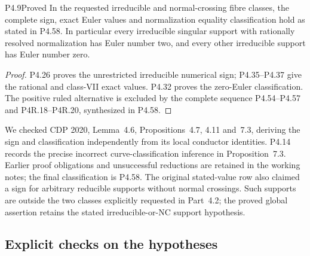 \begin{statement}{P4.9}{Proved}
In the requested irreducible and normal-crossing fibre classes,
the complete sign, exact Euler values and normalization equality
classification hold as stated in P4.58. In particular every
irreducible singular support with rationally resolved normalization
has Euler number two, and every other irreducible support has
Euler number zero.
\end{statement}
\begin{proof}
P4.26 proves the unrestricted irreducible numerical sign;
P4.35--P4.37 give the rational and class-VII exact values.
P4.32 proves the zero-Euler classification. The positive ruled
alternative is excluded by the complete sequence P4.54--P4.57
and P4R.18--P4R.20, synthesized in P4.58.
\end{proof}
We checked CDP 2020, Lemma~4.6, Propositions~4.7,
4.11 and~7.3, deriving the sign and classification independently
from its local conductor identities. P4.14 records the precise
incorrect curve-classification inference in Proposition~7.3.
Earlier proof obligations and unsuccessful reductions are retained
in the working notes; the final classification is P4.58.
The original stated-value row also claimed a sign for arbitrary
reducible supports without normal crossings. Such supports are
outside the two classes explicitly requested in Part~4.2; the
proved global assertion retains the stated irreducible-or-NC
support hypothesis.

\subsection{Explicit checks on the hypotheses}

